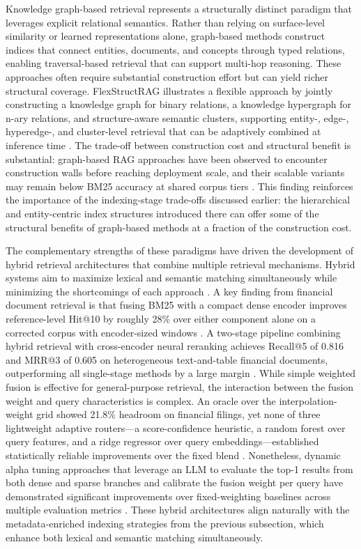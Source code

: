 \documentclass[11pt]{article}
\begin{document}
Knowledge graph-based retrieval represents a structurally distinct paradigm that leverages explicit relational semantics. Rather than relying on surface-level similarity or learned representations alone, graph-based methods construct indices that connect entities, documents, and concepts through typed relations, enabling traversal-based retrieval that can support multi-hop reasoning. These approaches often require substantial construction effort but can yield richer structural coverage. FlexStructRAG illustrates a flexible approach by jointly constructing a knowledge graph for binary relations, a knowledge hypergraph for n-ary relations, and structure-aware semantic clusters, supporting entity-, edge-, hyperedge-, and cluster-level retrieval that can be adaptively combined at inference time \cite{ref113}. The trade-off between construction cost and structural benefit is substantial: graph-based RAG approaches have been observed to encounter construction walls before reaching deployment scale, and their scalable variants may remain below BM25 accuracy at shared corpus tiers \cite{ref100}. This finding reinforces the importance of the indexing-stage trade-offs discussed earlier: the hierarchical and entity-centric index structures introduced there can offer some of the structural benefits of graph-based methods at a fraction of the construction cost.

The complementary strengths of these paradigms have driven the development of hybrid retrieval architectures that combine multiple retrieval mechanisms. Hybrid systems aim to maximize lexical and semantic matching simultaneously while minimizing the shortcomings of each approach \cite{ref114}. A key finding from financial document retrieval is that fusing BM25 with a compact dense encoder improves reference-level Hit@10 by roughly 28\% over either component alone on a corrected corpus with encoder-sized windows \cite{ref115}. A two-stage pipeline combining hybrid retrieval with cross-encoder neural reranking achieves Recall@5 of 0.816 and MRR@3 of 0.605 on heterogeneous text-and-table financial documents, outperforming all single-stage methods by a large margin \cite{ref99}. While simple weighted fusion is effective for general-purpose retrieval, the interaction between the fusion weight and query characteristics is complex. An oracle over the interpolation-weight grid showed 21.8\% headroom on financial filings, yet none of three lightweight adaptive routers---a score-confidence heuristic, a random forest over query features, and a ridge regressor over query embeddings---established statistically reliable improvements over the fixed blend \cite{ref115}. Nonetheless, dynamic alpha tuning approaches that leverage an LLM to evaluate the top-1 results from both dense and sparse branches and calibrate the fusion weight per query have demonstrated significant improvements over fixed-weighting baselines across multiple evaluation metrics \cite{ref116}. These hybrid architectures align naturally with the metadata-enriched indexing strategies from the previous subsection, which enhance both lexical and semantic matching simultaneously.
\end{document}
